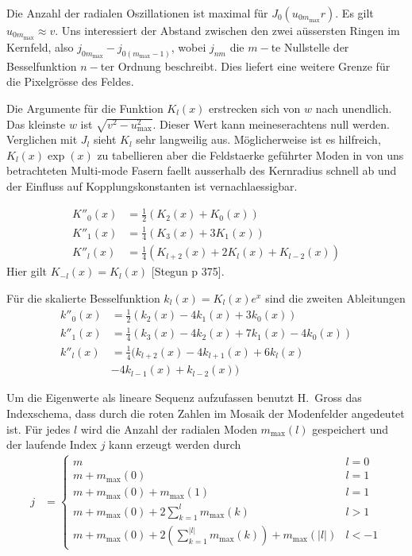 \documentclass{article}
\def\({\left(}
\def\){\right)}
\newcommand{\mmax}{m_\textrm{max}}
\newcommand{\umax}{u_\textrm{max}}
\begin{document}
Die Anzahl der radialen Oszillationen ist maximal f\"ur $J_0(u_{0
  m_\textrm{max}} r)$.  Es gilt $u_{0 m_\textrm{max}} \approx v$. Uns
interessiert der Abstand zwischen den zwei a\"ussersten Ringen im
Kernfeld, also $j_{0m_\textrm{max}} - j_{0 (m_\textrm{max}-1)}$, wobei
$j_{nm}$ die $m-$te Nullstelle der Besselfunktion $n-$ter Ordnung
beschreibt.  Dies liefert eine weitere Grenze f\"ur die Pixelgr\"osse
des Feldes.

Die Argumente f\"ur die Funktion $K_l(x)$ erstrecken sich von $w$ nach
unendlich. Das kleinste $w$ ist $\sqrt{v^2-\umax^2}$. Dieser Wert kann
meineserachtens null werden. Verglichen mit $J_l$ sieht $K_l$ sehr
langweilig aus. M\"oglicherweise ist es hilfreich, $K_l(x)\exp(x)$ zu
tabellieren aber die Feldstaerke gef\"uhrter Moden in von uns
betrachteten Multi-mode Fasern faellt ausserhalb des Kernradius
schnell ab und der Einfluss auf Kopplungskonstanten ist
vernachlaessigbar.


\begin{align}
  K''_0(x) &= \frac{1}{2}\(K_2(x)+K_0(x)\)\\
  K''_1(x) &= \frac{1}{4}\(K_3(x)+3K_1(x)\)\\
  K''_l(x) &= \frac{1}{4}\(K_{l+2}(x)+2K_l(x)+K_{l-2}(x)\)
\end{align}
Hier gilt $K_{-l}(x) = K_l(x)$ [Stegun p 375]. 

F\"ur die skalierte Besselfunktion $k_l(x)=K_l(x)e^x$ sind die zweiten Ableitungen
\begin{align}
  k''_0(x) &= \frac{1}{2}\(k_2(x)-4k_1(x)+3k_0(x)\)\\
  k''_1(x) &= \frac{1}{4}\(k_3(x)-4k_2(x)+7k_1(x)-4k_0(x)\)\\
  k''_l(x) &= \frac{1}{4}\big(k_{l+2}(x)-4k_{l+1}(x)+6k_l(x) \nonumber \\ 
&  -4k_{l-1}(x)+k_{l-2}(x)\big)
\end{align}


Um die Eigenwerte als lineare Sequenz aufzufassen benutzt H.~Gross das
Indexschema, dass durch die roten Zahlen im Mosaik der Modenfelder
angedeutet ist. F\"ur jedes $l$ wird die Anzahl der radialen Moden
$\mmax(l)$ gespeichert und der laufende Index $j$ kann erzeugt werden
durch
\begin{align}
  j &= \begin{cases}
    m & l=0\\
    m+\mmax(0) & l=1\\
    m+\mmax(0)+\mmax(1) & l=1\\
    m+\mmax(0)+ 2\sum_{k=1}^l \mmax(k) & l>1 \\
    m+\mmax(0)+ 2\(\sum_{k=1}^{|l|} \mmax(k)\) + \mmax(|l|) & l<-1
\end{cases}
\end{align}
\end{document}
